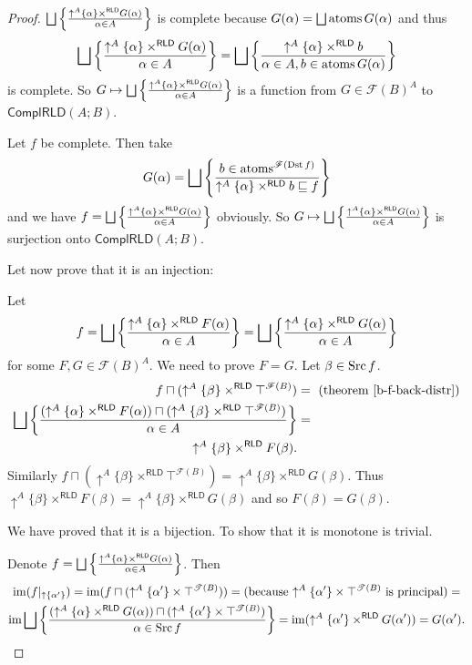 \begin{proof}
$\bigsqcup\left\{ \frac{\uparrow^{A}\{\alpha\}\times^{\mathsf{RLD}}G(\alpha)}{\alpha\in A}\right\}$
is complete because $G(\alpha)=\bigsqcup\operatorname{atoms} G(\alpha)$ and thus
\[
\bigsqcup\left\{ \frac{\uparrow^{A}\{\alpha\}\times^{\mathsf{RLD}}G(\alpha)}{\alpha\in A}\right\}=\bigsqcup\left\{ \frac{\uparrow^{A}\{\alpha\}\times^{\mathsf{RLD}}b}{\alpha\in A,b\in\operatorname{atoms} G(\alpha)}\right\}
\]
is complete. So $G\mapsto\bigsqcup\left\{ \frac{\uparrow^{A}\{\alpha\}\times^{\mathsf{RLD}}G(\alpha)}{\alpha\in A}\right\}$
is a function from $G\in\mathscr{F}(B)^{A}$ to $\mathsf{ComplRLD}(A;B)$.

Let $f$ be complete. Then take
\[
G(\alpha)=\bigsqcup\left\{ \frac{b\in\operatorname{atoms}^{\mathscr{F}(\operatorname{Dst} f)}}{\uparrow^{A}\{\alpha\}\times^{\mathsf{RLD}}b\sqsubseteq f}\right\}
\]
and we have $f=\bigsqcup\left\{ \frac{\uparrow^{A}\{\alpha\}\times^{\mathsf{RLD}}G(\alpha)}{\alpha\in A}\right\}$
obviously. So $G\mapsto\bigsqcup\left\{ \frac{\uparrow^{A}\{\alpha\}\times^{\mathsf{RLD}}G(\alpha)}{\alpha\in A}\right\}$
is surjection onto $\mathsf{ComplRLD}(A;B)$.

Let now prove that it is an injection:

Let
\[
f=\bigsqcup\left\{ \frac{\uparrow^{A}\{\alpha\}\times^{\mathsf{RLD}}F(\alpha)}{\alpha\in A}\right\}=\bigsqcup\left\{ \frac{\uparrow^{A}\{\alpha\}\times^{\mathsf{RLD}}G(\alpha)}{\alpha\in A}\right\}
\]
for some $F,G\in\mathscr{F}(B)^{A}$. We need to prove $F=G$. Let
$\beta\in\operatorname{Src} f$.
\begin{align*}
f\sqcap(\uparrow^{A}\{\beta\}\times^{\mathsf{RLD}}\top^{\mathscr{F}(B)}) & =\text{ (theorem~\ref{b-f-back-distr})}\\
\bigsqcup\left\{ \frac{(\uparrow^{A}\{\alpha\}\times^{\mathsf{RLD}}F(\alpha))\sqcap(\uparrow^{A}\{\beta\}\times^{\mathsf{RLD}}\top^{\mathscr{F}(B)})}{\alpha\in A}\right\} & =\\
\uparrow^{A}\{\beta\}\times^{\mathsf{RLD}}F(\beta).
\end{align*}
Similarly $f\sqcap(\uparrow^{A}\{\beta\}\times^{\mathsf{RLD}}\top^{\mathscr{F}(B)})=\uparrow^{A}\{\beta\}\times^{\mathsf{RLD}}G(\beta)$.
Thus $\uparrow^{A}\{\beta\}\times^{\mathsf{RLD}}F(\beta)=\uparrow^{A}\{\beta\}\times^{\mathsf{RLD}}G(\beta)$
and so $F(\beta)=G(\beta)$.

We have proved that it is a bijection. To show that it is monotone
is trivial.

Denote $f=\bigsqcup\left\{ \frac{\uparrow^{A}\{\alpha\}\times^{\mathsf{RLD}}G(\alpha)}{\alpha\in A}\right\}$.
Then
\begin{multline*}
\operatorname{im}(f|_{\uparrow \{\alpha'\}})=\operatorname{im}(f\sqcap(\uparrow^{A}\{\alpha'\}\times\top^{\mathscr{T}(B)}))=\text{(because \ensuremath{\uparrow^{A}\{\alpha'\}\times\top^{\mathscr{T}(B)}} is principal)}=\\
\operatorname{im}\bigsqcup\left\{ \frac{(\uparrow^{A}\{\alpha\}\times^{\mathsf{RLD}}G(\alpha))\sqcap(\uparrow^{A}\{\alpha'\}\times\top^{\mathscr{T}(B)})}{\alpha\in\operatorname{Src} f}\right\}=\operatorname{im}(\uparrow^{A}\{\alpha'\}\times^{\mathsf{RLD}}G(\alpha'))=G(\alpha').
\end{multline*}
\end{proof}
